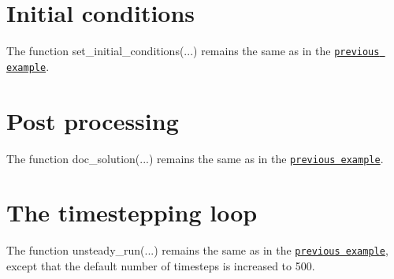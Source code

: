 

\hypertarget{index_IC}{}\section{Initial conditions}\label{index_IC}
The function {\ttfamily set\+\_\+initial\+\_\+conditions}(...) remains the same as in the \href{../../rayleigh_channel/html/index.html#IC}{\tt previous example}.



 

\hypertarget{index_doc}{}\section{Post processing}\label{index_doc}
The function {\ttfamily doc\+\_\+solution}(...) remains the same as in the \href{../../rayleigh_channel/html/index.html#doc}{\tt previous example}.



 

\hypertarget{index_unsteady_run}{}\section{The timestepping loop}\label{index_unsteady_run}
The function {\ttfamily unsteady\+\_\+run}(...) remains the same as in the \href{../../rayleigh_channel/html/index.html#unsteady_run}{\tt previous example}, except that the default number of timesteps is increased to 500.



 

